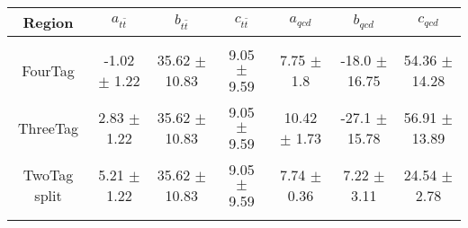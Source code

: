 \begin{footnotesize} 
\begin{tabular}{c|c|c|c|c|c|c} 
Region & $ a_{t\bar{t}}$ & $ b_{t\bar{t}}$ & $ c_{t\bar{t}}$ & $ a_{qcd}$ & $ b_{qcd}$ & $c_{qcd}$ \\ 
\hline\hline 
& & & & & &\\ 
FourTag & -1.02 $\pm$ 1.22 & 35.62 $\pm$ 10.83 & 9.05 $\pm$ 9.59 & 7.75 $\pm$ 1.8 & -18.0 $\pm$ 16.75 & 54.36 $\pm$ 14.28\\ 
ThreeTag & 2.83 $\pm$ 1.22 & 35.62 $\pm$ 10.83 & 9.05 $\pm$ 9.59 & 10.42 $\pm$ 1.73 & -27.1 $\pm$ 15.78 & 56.91 $\pm$ 13.89\\ 
TwoTag split & 5.21 $\pm$ 1.22 & 35.62 $\pm$ 10.83 & 9.05 $\pm$ 9.59 & 7.74 $\pm$ 0.36 & 7.22 $\pm$ 3.11 & 24.54 $\pm$ 2.78\\ 
& & & & & &\\ 
\hline\hline 
\end{tabular} 
\end{footnotesize} 
\newline 
